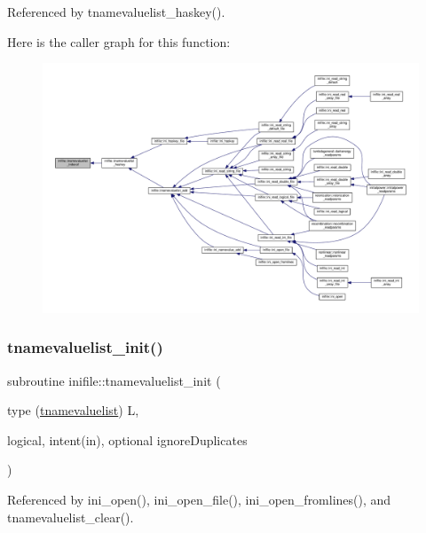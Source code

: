 Referenced by tnamevaluelist\+\_\+haskey().

Here is the caller graph for this function\+:
\nopagebreak
\begin{figure}[H]
\begin{center}
\leavevmode
\includegraphics[width=350pt]{namespaceinifile_a040f1b3c4c75c262385aa1452ec39343_icgraph}
\end{center}
\end{figure}
\mbox{\label{namespaceinifile_a1b5283277321bb0c12d8495bd16c23be}} 
\subsubsection{\texorpdfstring{tnamevaluelist\+\_\+init()}{tnamevaluelist\_init()}}
{\footnotesize\ttfamily subroutine inifile\+::tnamevaluelist\+\_\+init (\begin{DoxyParamCaption}\item[{type (\mbox{\hyperlink{structinifile_1_1tnamevaluelist}{tnamevaluelist}})}]{L,  }\item[{logical, intent(in), optional}]{ignore\+Duplicates }\end{DoxyParamCaption})}



Referenced by ini\+\_\+open(), ini\+\_\+open\+\_\+file(), ini\+\_\+open\+\_\+fromlines(), and tnamevaluelist\+\_\+clear().

